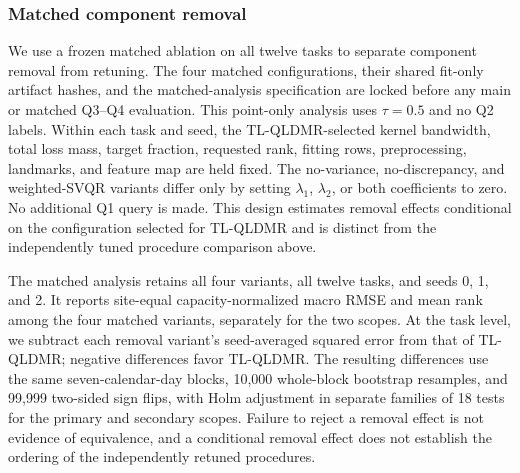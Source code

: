 
\subsubsection{Matched component removal}
{\color{blue}We use a frozen matched ablation on all twelve tasks to separate component removal from retuning. The four matched configurations, their shared fit-only artifact hashes, and the matched-analysis specification are locked before any main or matched Q3--Q4 evaluation. This point-only analysis uses $\tau=0.5$ and no Q2 labels. Within each task and seed, the TL-QLDMR-selected kernel bandwidth, total loss mass, target fraction, requested rank, fitting rows, preprocessing, landmarks, and feature map are held fixed. The no-variance, no-discrepancy, and weighted-SVQR variants differ only by setting $\lambda_1$, $\lambda_2$, or both coefficients to zero. No additional Q1 query is made. This design estimates removal effects conditional on the configuration selected for TL-QLDMR and is distinct from the independently tuned procedure comparison above.}

{\color{blue}The matched analysis retains all four variants, all twelve tasks, and seeds 0, 1, and 2. It reports site-equal capacity-normalized macro RMSE and mean rank among the four matched variants, separately for the two scopes. At the task level, we subtract each removal variant's seed-averaged squared error from that of TL-QLDMR; negative differences favor TL-QLDMR. The resulting differences use the same seven-calendar-day blocks, 10,000 whole-block bootstrap resamples, and 99,999 two-sided sign flips, with Holm adjustment in separate families of 18 tests for the primary and secondary scopes. Failure to reject a removal effect is not evidence of equivalence, and a conditional removal effect does not establish the ordering of the independently retuned procedures.}




